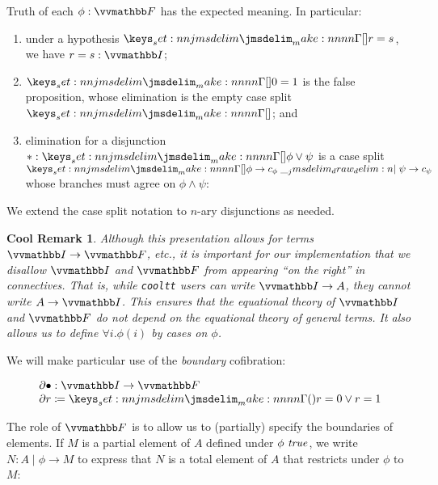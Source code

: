 \documentclass[draft]{amsart}
\newtheorem{cool}[theorem]{Cool Remark}
\begin{document}
Truth of each $\phi:\COF$ has the expected meaning. In particular:
%
\begin{enumerate}
  \item under a hypothesis $\TpPrf{r=s}$, we have $r=s:\DIM$;

  \item $\TpPrf{0=1}$ is the false proposition, whose elimination is the empty
  case split $\brk{}$; and

  \item elimination for a disjunction $*:\TpPrf{\phi\lor\psi}$ is a case split
  $\brk{\phi \to c_\phi \delimmid \psi \to c_\psi}$ whose branches must agree on
  $\phi\land\psi$:

  \begin{mathparpagebreakable}
  \end{mathparpagebreakable}
\end{enumerate}
%
We extend the case split notation to $n$-ary disjunctions as needed.

\begin{cool}
Although this presentation allows for terms $\DIM\to\COF$, etc., it is important
for our implementation that we disallow $\DIM$ and $\COF$ from appearing ``on
the right'' in connectives. That is, while \texttt{cooltt} users can write
$\DIM\to A$, they cannot write $A\to\DIM$. This ensures that the equational
theory of $\DIM$ and $\COF$ do not depend on the equational theory of general
terms. It also allows us to define $\forall i.\phi(i)$ by cases on $\phi$.
\end{cool}

We will make particular use of the \emph{boundary} cofibration:

\[
  \begin{array}{l}
    \Boundary{\bullet} : \DIM\to\COF\\
    \Boundary{r} \coloneq \prn{r=0 \lor r=1}
  \end{array}
\]

The role of $\COF$ is to allow us to (partially) specify the boundaries of
elements. If $M$ is a partial element of $A$ defined under $\IsTrue{\phi}$, we
write $N : A \mid \phi \to M$ to express that $N$ is a total element of $A$ that
restricts under $\phi$ to $M$:
\end{document}
